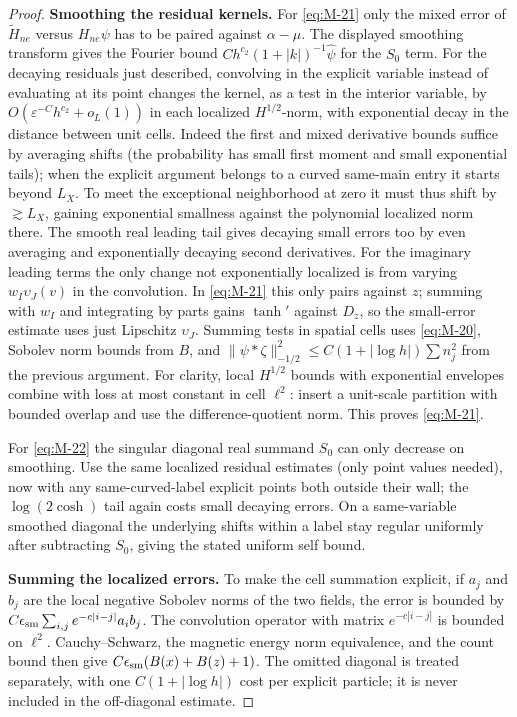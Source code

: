 \begin{proof}
\par\smallskip\noindent\textbf{Smoothing the residual kernels.}
For \eqref{eq:M-21} only the mixed error of \(\widetilde H_{ne}\) versus \(H_{ne}\psi\) has to be paired against \(\alpha-\mu\). The displayed smoothing transform gives the Fourier bound \(Ch^{c_2}(1+|k|)^{-1}\widehat\psi\) for the \(S_0\) term. For the decaying residuals just described, convolving in the explicit variable instead of evaluating at its point changes the kernel, as a test in the interior variable, by \(O(\varepsilon^{-C}h^{c_2}+o_L(1))\) in each localized \(H^{1/2}\)-norm, with exponential decay in the distance between unit cells. Indeed the first and mixed derivative bounds suffice by averaging shifts (the probability has small first moment and small exponential tails); when the explicit argument belongs to a curved same-main entry it starts beyond \(L_X\). To meet the exceptional neighborhood at zero it must thus shift by \(\gtrsim L_X\), gaining exponential smallness against the polynomial localized norm there. The smooth real leading tail gives decaying small errors too by even averaging and exponentially decaying second derivatives. For the imaginary leading terms the only change not exponentially localized is from varying \(w_I \upsilon_J(v)\) in the convolution. In \eqref{eq:M-21} this only pairs against \(z\); summing with \(w_I\) and integrating by parts gains \(\tanh'\) against \(D_z\), so the small-error estimate uses just Lipschitz \(\upsilon_J\). Summing tests in spatial cells uses \eqref{eq:M-20}, Sobolev norm bounds from \(B\), and \(\|\psi*\zeta\|_{-1/2}^2\le C(1+|\log h|)\sum n_j^2\) from the previous argument. For clarity, local \(H^{1/2}\) bounds with exponential envelopes combine with loss at most constant in cell \(\ell^2\): insert a unit-scale partition with bounded overlap and use the difference-quotient norm. This proves \eqref{eq:M-21}.

For \eqref{eq:M-22} the singular diagonal real summand \(S_0\) can only decrease on smoothing. Use the same localized residual estimates (only point values needed), now with any same-curved-label explicit points both outside their wall; the \(\log(2\cosh)\) tail again costs small decaying errors. On a same-variable smoothed diagonal the underlying shifts within a label stay regular uniformly after subtracting \(S_0\), giving the stated uniform self bound.


\par\smallskip\noindent\textbf{Summing the localized errors.}
To make the cell summation explicit, if \(a_j\) and \(b_j\) are the
local negative Sobolev norms of the two fields, the error is bounded by
\(C\epsilon_{\rm sm}\sum_{i,j}e^{-c|i-j|}a_i b_j\).
The convolution operator with matrix \(e^{-c|i-j|}\) is bounded on
\(\ell^2\). Cauchy--Schwarz, the magnetic energy norm equivalence, and
the count bound then give
\(C\epsilon_{\rm sm}(B(x)+B(z)+1)\). The omitted diagonal is treated
separately, with one \(C(1+|\log h|)\) cost per explicit particle;
it is never included in the off-diagonal estimate.

\end{proof}

